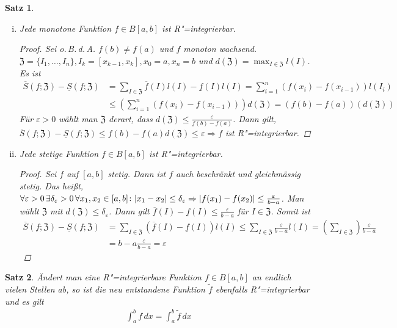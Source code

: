 \documentclass[ngerman,titlepage,twoside, parskip=half*]{scrreprt}
\newcommand*{\ZZ}{\mathfrak{Z}}
\theoremstyle{break}
\newtheorem{theorem}{Satz}[section]
\theoremstyle{nonumberbreak}
\newtheorem{proof}{Beweis:}
\DeclarePairedDelimiter{\abs}{\lvert}{\rvert}
\begin{document}
\begin{theorem}
  \begin{enumerate}[(i)]
  \item Jede \emph{monotone} Funktion $f\in B[a,b]$ ist
    R"=integrierbar.
    \begin{proof}
      Sei o.\,B.\,d.\,A. $f(b)\neq f(a)$ und $f$ monoton wachsend.
      $\ZZ=\{I_1,\dots,I_n\}, I_k=[x_{k-1},x_k], x_0=a,x_n=b$ und $d (
      \ZZ)= \max_{I\in\ZZ} l (I)$. Es ist
      \begin{align*}
        \overline{S}(f;\ZZ)-\underline{S}(f;\ZZ) &= \sum_{I\in\ZZ}
        \overline{f}(I) l(I)-\underline{f}(I)l(I) = \sum_{i=1}^n
        (f(x_i)-f(x_{i-1}))l(I_i)\\
        &\leq \left( \sum_{i=1}^n (f(x_i)-f(x_{i-1})) \right)d(\ZZ)=
        (f(b)-f(a))(d(\ZZ))
      \end{align*}
      Für $\varepsilon>0$ wählt man $\ZZ$ derart, dass $d(\ZZ)\leq
      \frac{\varepsilon}{f(b)-f(a)}$. Dann gilt, $\overline{S}(f;\ZZ)-
      \underline{S}(f;\ZZ)\leq f(b)-f(a)d(\ZZ)\leq \varepsilon\Rightarrow f$
      ist R"=integrierbar.
    \end{proof}

    \item Jede \emph{stetige} Funktion $f\in B[a,b]$ ist
      R"=integrierbar.
      \begin{proof}
        Sei $f$ auf $[a,b]$ stetig. Dann ist $f$ auch beschränkt
        und gleichmässig stetig. Das heißt, 
        $\forall\varepsilon>0\,\exists\delta_\varepsilon>0\,\forall
        x_1, x_2\in [a,b]\colon \abs{x_1-x_2}\leq \delta_\varepsilon
        \Rightarrow\abs{f(x_1)-f(x_2)}\leq
        \frac{\varepsilon}{b-a}$. Man wählt $\ZZ$ mit $d(\ZZ)\leq 
        \delta_\varepsilon$. Dann gilt $\overline{f}(I)-\underline{f}(I)\leq
        \frac{\varepsilon}{b-a}$ für $I \in\ZZ$. Somit ist
        \begin{align*}
          \overline{S}(f;\ZZ)-\underline{S}(f;\ZZ)&= \sum_{I\in\ZZ}
          (\overline{f}(I)-\underline{f}(I))l(I)\leq \sum_{I\in\ZZ}
          \frac{\varepsilon}{b-a} l(I)=\left( \sum_{I\in\ZZ} 
          \right)\frac{\varepsilon}{b-a}\\
          &= b-a\frac{\varepsilon}{b-a}=\varepsilon
        \end{align*}
      \end{proof}
  \end{enumerate}
\end{theorem}

\begin{theorem}
  Ändert man eine R"=integrierbare Funktion $f\in B[a,b]$ an endlich vielen
  Stellen ab, so ist die neu entstandene Funktion $\tilde{f}$ ebenfalls
  R"=integrierbar und es gilt
  \begin{gather*}
    \int_a^b f\,dx = \int_a^b \tilde{f}\,dx
  \end{gather*}
\end{theorem}
\end{document}
